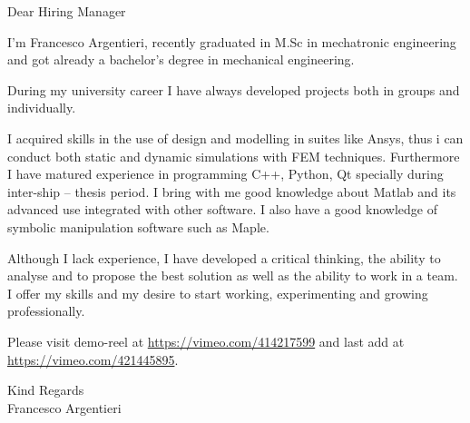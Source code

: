 \documentclass[a4paper,english]{friggeri-letter}
\begin{document}
\address{
   Circonvallazione Istoniense, 20 \\
   Vasto (CH), 66054 \\
   Italy
}



\opening{Dear Hiring Manager}

I'm Francesco Argentieri, recently graduated in M.Sc in mechatronic
engineering and got already a bachelor's degree in mechanical engineering.

During my university career I have always developed projects both in groups
and individually.

I acquired skills in the use of design and modelling in suites like Ansys,
thus i can conduct both static and dynamic simulations with FEM techniques.
Furthermore I have matured experience in programming C++, Python, Qt specially
 during inter-ship -- thesis period.  I bring with me good knowledge about
Matlab and its advanced use integrated with other software. I also have a good
knowledge of symbolic manipulation software such as Maple. 

Although I lack experience, I have developed a critical thinking, the ability
to analyse and to propose the best solution as well as the ability to work in
a team.  I offer my skills and my desire to start working, experimenting and
growing professionally.

Please visit demo-reel at
\href{https://vimeo.com/414217599}{https://vimeo.com/414217599} and last add
at\hfill\linebreak
\href{https://vimeo.com/421445895}{https://vimeo.com/421445895}.

\closing{
   Kind Regards\\
   Francesco Argentieri
}
\end{document}
